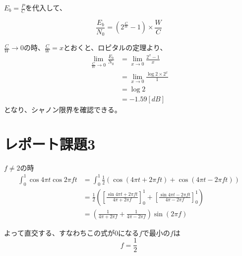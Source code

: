 \documentclass[dvipdfmx]{jsarticle}
\begin{document}
$E_{b} = \frac{P}{C}$を代入して、

\[ \frac{E_{b}}{N_{0}} = (2^{\frac{C}{W}}-1)\times \frac{W}{C}\]

$\frac{C}{W} \to 0$の時、$\frac{C}{W} = x$とおくと、ロピタルの定理より、
\begin{align*}
\lim_{\frac{C}{W} \to 0} \frac{E_{b}}{N_{0}} &= \lim_{x \to 0} \frac{2^{x}-1}{x} \\
&= \lim_{x \to 0} \frac{\log{2}\times 2^{x}}{1} \\
&= \log{2} \\
&= -1.59[dB]
\end{align*}
となり、シャノン限界を確認できる。

\section{レポート課題3}
$f \neq 2$の時
\begin{align*}
\int _{0} ^{1} \cos{4\pi t}\cos{2\pi ft} &= \int _{0}^{1} \frac{1}{2}(\cos{(4\pi t + 2\pi ft)}+\cos{(4\pi t - 2\pi ft)})\\
&= \frac{1}{2} ([\frac{\sin{4\pi t + 2\pi ft}}{4\pi + 2\pi f}]^{1} _{0} + [\frac{\sin{4\pi t - 2\pi ft}}{4\pi - 2\pi f}]^{1} _{0}) \\
&= (\frac{1}{4\pi + 2\pi f} + \frac{1}{4\pi - 2\pi f})\sin (2\pi f)
\end{align*}

よって直交する、すなわちこの式が0になる$f$で最小の$f$は
\[f = \frac{1}{2}\]
\end{document}
